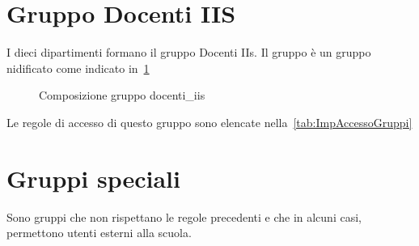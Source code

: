 \section{Gruppo Docenti IIS}
I dieci dipartimenti formano il gruppo Docenti IIs. Il gruppo è un gruppo nidificato come indicato in~\cref{fig:verticalidocenti}
\begin{figure}
	\centering
	
	\caption{Composizione gruppo docenti\_iis}
	\label{fig:verticalidocenti}
\end{figure}
Le  regole di accesso di questo gruppo sono elencate nella~\cref{tab:ImpAccessoGruppi}
\section{Gruppi speciali}
Sono gruppi che non rispettano le regole precedenti e che in alcuni casi, permettono utenti esterni alla scuola.
